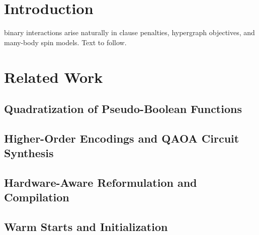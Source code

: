 \documentclass{ieeeaccess}
\begin{document}
\titlepgskip=-15pt

\maketitle

\section{Introduction}
\label{sec:introduction}
 binary interactions arise naturally in clause penalties,
hypergraph objectives, and many-body spin models. Text to follow.


\section{Related Work}
\label{sec:related}

\subsection{Quadratization of Pseudo-Boolean Functions}
\label{sec:related:quadratization}

\subsection{Higher-Order Encodings and QAOA Circuit Synthesis}
\label{sec:related:higherorder}

\subsection{Hardware-Aware Reformulation and Compilation}
\label{sec:related:hardware}

\subsection{Warm Starts and Initialization}
\label{sec:related:warmstart}
\end{document}
